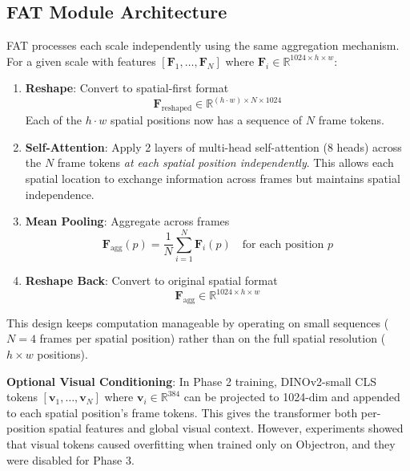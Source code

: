\subsection{FAT Module Architecture}

FAT processes each scale independently using the same aggregation mechanism. For a given scale with features $[\mathbf{F}_1, \ldots, \mathbf{F}_N]$ where $\mathbf{F}_i \in \mathbb{R}^{1024 \times h \times w}$:

\begin{enumerate}
    \item \textbf{Reshape}: Convert to spatial-first format
    \begin{equation}
        \mathbf{F}_{\text{reshaped}} \in \mathbb{R}^{(h \cdot w) \times N \times 1024}
    \end{equation}
    Each of the $h \cdot w$ spatial positions now has a sequence of $N$ frame tokens.

    \item \textbf{Self-Attention}: Apply 2 layers of multi-head self-attention (8 heads) across the $N$ frame tokens \emph{at each spatial position independently}. This allows each spatial location to exchange information across frames but maintains spatial independence.

    \item \textbf{Mean Pooling}: Aggregate across frames
    \begin{equation}
        \mathbf{F}_{\text{agg}}(p) = \frac{1}{N} \sum_{i=1}^N \mathbf{F}_i(p) \quad \text{for each position } p
    \end{equation}

    \item \textbf{Reshape Back}: Convert to original spatial format
    \begin{equation}
        \mathbf{F}_{\text{agg}} \in \mathbb{R}^{1024 \times h \times w}
    \end{equation}
\end{enumerate}

This design keeps computation manageable by operating on small sequences ($N=4$ frames per spatial position) rather than on the full spatial resolution ($h \times w$ positions).

\textbf{Optional Visual Conditioning}: In Phase 2 training, DINOv2-small CLS tokens $[\mathbf{v}_1, \ldots, \mathbf{v}_N]$ where $\mathbf{v}_i \in \mathbb{R}^{384}$ can be projected to 1024-dim and appended to each spatial position's frame tokens. This gives the transformer both per-position spatial features and global visual context. However, experiments showed that visual tokens caused overfitting when trained only on Objectron, and they were disabled for Phase 3.

